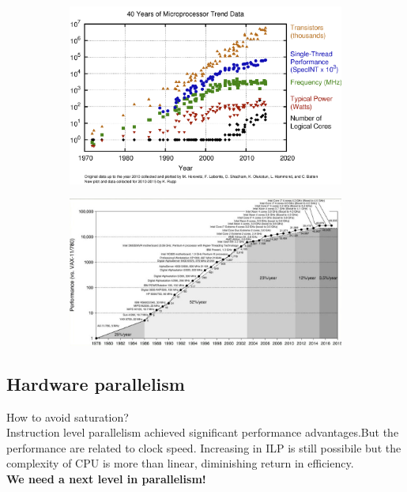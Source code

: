 \begin{figure}[ht]
\centering
\begin{subfigure}{.5\textwidth}
  \centering
  \includegraphics[width=.9\textwidth]{figure_parallel/moore.png}
\end{subfigure}%
\begin{subfigure}{.5\textwidth}
  \centering
  \includegraphics[width=.9\textwidth]{figure_parallel/moore2.png}
\end{subfigure}
\end{figure}

\subsection{Hardware parallelism}

How to avoid saturation?\\
Instruction level parallelism achieved significant performance advantages.But the performance are related to clock speed. Increasing in ILP is still possibile but the complexity of CPU is more than linear, diminishing return in efficiency.\\
\textbf{We need a next level in parallelism!}

